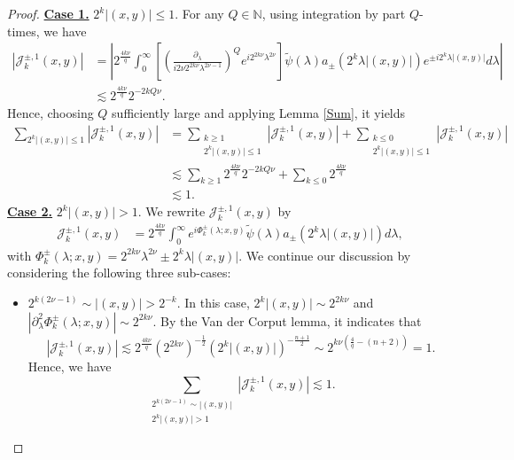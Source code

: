 \documentclass[10pt,a4paper]{amsart}
\begin{document}
\begin{proof}
\textbf{\underline{Case 1.}} $2^k|(x,y)|\leq 1$. For any $Q\in\mathbb{N}$, using integration by part $Q$-times, we have
\begin{align*}
|\mathcal{J}_k^{\pm,1}(x,y)|&=\left|2^\frac{4k\nu}{q}\int_0^\infty  \left[\left(\frac{\partial_\lambda}{i2\nu 2^{2k\nu}\lambda^{2\nu-1}}\right)^Q e^{i2^{2k\nu}\lambda^{2\nu}}\right] \widetilde{\psi}(\lambda)a_{\pm}(2^k\lambda|(x,y)|)e^{\pm i2^k\lambda|(x,y)|}d\lambda\right|\\
&\lesssim 2^\frac{4k\nu}{q}2^{-2kQ\nu}.
\end{align*}
Hence, choosing $Q$ sufficiently large and applying Lemma \ref{Sum}, it yields
\begin{equation}\label{Case 1}
\begin{aligned}
\sum_{2^k|(x,y)|\leq 1}|\mathcal{J}_k^{\pm,1}(x,y)|&=\sum_{\substack{k\geq 1\\ 2^k|(x,y)|\leq 1}}|\mathcal{J}_k^{\pm,1}(x,y)|+\sum_{\substack{k\leq 0\\ 2^k|(x,y)|\leq 1}}|\mathcal{J}_k^{\pm,1}(x,y)|\\
&\lesssim \sum_{k\geq1}2^\frac{4k\nu}{q}2^{-2kQ\nu}+\sum_{k\leq 0}2^\frac{4k\nu}{q}\\
&\lesssim 1.
\end{aligned}
\end{equation}
\textbf{\underline{Case 2.}} $2^k|(x,y)|>1$. We rewrite $\mathcal{J}_k^{\pm,1}(x,y)$ by
\begin{align*}
\mathcal{J}_k^{\pm,1}(x,y)
&=2^\frac{4k\nu}{q}\int_0^\infty  e^{i\Phi^\pm_k(\lambda;x,y)}\widetilde{\psi}(\lambda)a_{\pm}(2^k\lambda|(x,y)|)d\lambda,
\end{align*} 
with $\Phi^\pm_k(\lambda;x,y)=2^{2k\nu}\lambda^{2\nu} \pm 2^k\lambda|(x,y)|$. We continue our discussion by considering the following three sub-cases:
\begin{itemize}
\item $2^{k(2\nu-1)}\sim |(x,y)|>2^{-k}$. In this case, $2^k|(x,y)|\sim 2^{2k\nu}$ and $|\partial_\lambda^2\Phi^\pm_k(\lambda;x,y)|\sim 2^{2k\nu}$. By the Van der Corput lemma, it indicates that
\begin{equation}
|\mathcal{J}_k^{\pm,1}(x,y)|\lesssim 2^\frac{4k\nu}{q} \left(2^{2k\nu}\right)^{-\frac{1}{2}}\left(2^k|(x,y)|\right)^{-\frac{n+1}{2}}\sim 2^{k\nu(\frac{4}{q}-(n+2))}=1.
\end{equation}
Hence, we have
\begin{equation}\label{Subcase 1}
\sum_{\substack{2^{k(2\nu-1)}\sim |(x,y)|\\ 2^k|(x,y)|>1}}|\mathcal{J}_k^{\pm,1}(x,y)|\lesssim 1.

\end{equation}
\end{itemize}
\end{proof}
\end{document}
